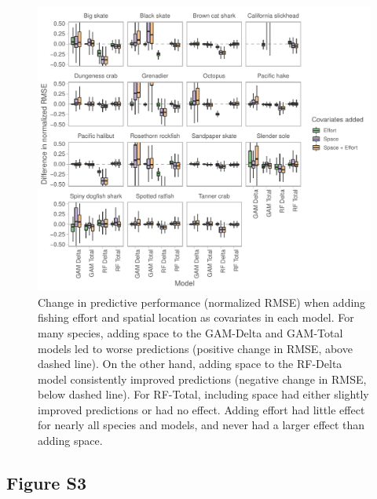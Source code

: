 \documentclass[]{article}
\begin{document}
\begin{figure}[H]

{\centering \includegraphics[width=7in]{bycatch_sim_paper_supplement_files/figure-latex/covariate-effects-1} 

}

\caption[Change in predictive performance (normalized RMSE) when adding fishing effort and spatial location as covariates in each model.]{Change in predictive performance (normalized RMSE) when adding fishing effort and spatial location as covariates in each model. For many species, adding space to the GAM-Delta and GAM-Total models led to worse predictions (positive change in RMSE, above dashed line). On the other hand, adding space to the RF-Delta model consistently improved predictions (negative change in RMSE, below dashed line). For RF-Total, including space had either slightly improved predictions or had no effect. Adding effort had little effect for nearly all species and models, and never had a larger effect than adding space.}\label{fig:covariate-effects}
\end{figure}

\pagebreak

\subsection{Figure S3}\label{figure-s3}
\end{document}
